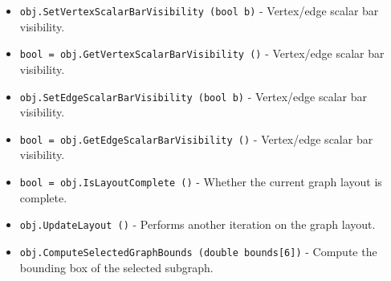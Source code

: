 \begin{itemize}
\item  \verb|obj.SetVertexScalarBarVisibility (bool b)| -  Vertex/edge scalar bar visibility.

\item  \verb|bool = obj.GetVertexScalarBarVisibility ()| -  Vertex/edge scalar bar visibility.

\item  \verb|obj.SetEdgeScalarBarVisibility (bool b)| -  Vertex/edge scalar bar visibility.

\item  \verb|bool = obj.GetEdgeScalarBarVisibility ()| -  Vertex/edge scalar bar visibility.

\item  \verb|bool = obj.IsLayoutComplete ()| -  Whether the current graph layout is complete.

\item  \verb|obj.UpdateLayout ()| -  Performs another iteration on the graph layout.

\item  \verb|obj.ComputeSelectedGraphBounds (double bounds[6])| -  Compute the bounding box of the selected subgraph.

\end{itemize}
